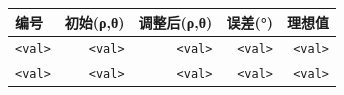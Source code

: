 \begin{tabular}{lrrrr}
\toprule
\textbf{编号} & \textbf{初始(ρ,θ)} & \textbf{调整后(ρ,θ)} & \textbf{误差(°)} & \textbf{理想值} \\\midrule
\texttt{<val>} & \texttt{<val>} & \texttt{<val>} & \texttt{<val>} & \texttt{<val>} \\
\texttt{<val>} & \texttt{<val>} & \texttt{<val>} & \texttt{<val>} & \texttt{<val>} \\\bottomrule
\end{tabular}
